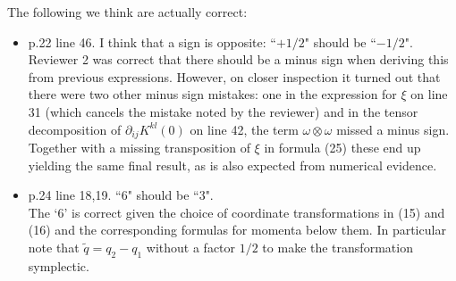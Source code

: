 \documentclass{article}
\begin{document}
The following we think are actually correct:
\begin{itemize}
\item p.22 line 46. I think that a sign is opposite: ``$+ 1/2$" should be ``$-1/2$".\\
  Reviewer 2 was correct that there should be a minus sign when
  deriving this from previous expressions. However, on closer
  inspection it turned out that there were two other minus sign
  mistakes: one in the expression for $\xi$ on line 31 (which cancels
  the mistake noted by the reviewer) and in the tensor decomposition
  of $\partial_{ij} K^{kl}(0)$ on line 42, the term
  $\omega \otimes \omega$ missed a minus sign. Together with a missing
  transposition of $\xi$ in formula (25) these end up yielding the
  same final result, as is also expected from numerical evidence.
\item p.24 line 18,19. ``$6$" should be ``$3$".\\
  The `$6$' is correct given the choice of coordinate
  transformations in (15) and (16) and the corresponding formulas for
  momenta below them. In particular note that $\tilde{q} = q_2 - q_1$
  without a factor $1/2$ to make the transformation symplectic.
\end{itemize}
\end{document}
